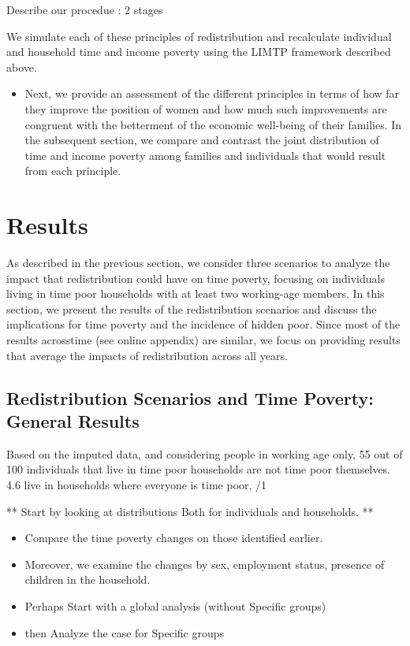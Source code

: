 \documentclass[
  11pt,
]{article}
\providecommand{\tightlist}{%
  \setlength{\itemsep}{0pt}\setlength{\parskip}{0pt}}\usepackage{longtable,booktabs,array}
\begin{document}
Describe our procedue : 2 stages

We simulate each of these principles of redistribution and recalculate
individual and household time and income poverty using the LIMTP
framework described above.

\begin{itemize}
\tightlist
\item
  Next, we provide an assessment of the different principles in terms of
  how far they improve the position of women and how much such
  improvements are congruent with the betterment of the economic
  well-being of their families. In the subsequent section, we compare
  and contrast the joint distribution of time and income poverty among
  families and individuals that would result from each principle.
\end{itemize}

\section{Results}\label{results}

As described in the previous section, we consider three scenarios to
analyze the impact that redistribution could have on time poverty,
focusing on individuals living in time poor households with at least two
working-age members. In this section, we present the results of the
redistribution scenarios and discuss the implications for time poverty
and the incidence of hidden poor. Since most of the results acrosstime
(see online appendix) are similar, we focus on providing results that
average the impacts of redistribution across all years.

\subsection{Redistribution Scenarios and Time Poverty: General
Results}\label{redistribution-scenarios-and-time-poverty-general-results}

Based on the imputed data, and considering people in working age only,
55 out of 100 individuals that live in time poor households are not time
poor themselves. 4.6 live in households where everyone is time poor, /1

** Start by looking at distributions Both for individuals and
households. **

\begin{itemize}
\item
  Compare the time poverty changes on those identified earlier.
\item
  Moreover, we examine the changes by sex, employment status, presence
  of children in the household.
\item
  Perhaps Start with a global analysis (without Specific groups)
\item
  then Analyze the case for Specific groups
\end{itemize}
\end{document}
